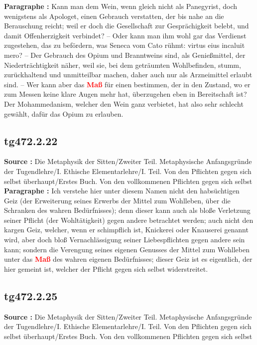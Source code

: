 \documentclass[a4paper,12pt,twoside]{book}
\newcommand{\match}[1]{\textcolor{red}{\textbf{#1}}}
\begin{document}
	\textbf{Paragraphe : }Kann man dem Wein, wenn gleich nicht als Panegyrist, doch wenigstens als Apologet, einen Gebrauch verstatten, der bis nahe an die Berauschung reicht; weil er doch die Gesellschaft zur Gesprächigkeit belebt, und damit Offenherzigkeit verbindet? – Oder kann man ihm wohl gar das Verdienst zugestehen, das zu befördern, was Seneca vom Cato rühmt: virtus eius incaluit mero? – Der Gebrauch des Opium und Branntweins sind, als Genießmittel, der Niederträchtigkeit näher, weil sie, bei dem geträumten Wohlbefinden, stumm, zurückhaltend und unmitteilbar machen, daher auch nur als Arzneimittel erlaubt sind. – Wer kann aber das \match{Maß} für einen bestimmen, der in den Zustand, wo er zum Messen keine klare Augen mehr hat, überzugehen eben in Bereitschaft ist? Der Mohammedanism, welcher den Wein ganz verbietet, hat also sehr schlecht gewählt, dafür das Opium zu erlauben. 
	
	\subsection*{tg472.2.22} 
	\textbf{Source : }Die Metaphysik der Sitten/Zweiter Teil. Metaphysische Anfangsgründe der Tugendlehre/I. Ethische Elementarlehre/I. Teil. Von den Pflichten gegen sich selbst überhaupt/Erstes Buch. Von den vollkommenen Pflichten gegen sich selbst\\  
	
	\textbf{Paragraphe : }Ich verstehe hier unter diesem Namen nicht den habsüchtigen Geiz (der Erweiterung seines Erwerbs der Mittel zum Wohlleben, über die Schranken des wahren Bedürfnisses); denn dieser kann auch als bloße Verletzung seiner Pflicht (der Wohltätigkeit) gegen andere betrachtet werden;  auch nicht den kargen Geiz, welcher, wenn er schimpflich ist, Knickerei oder Knauserei genannt wird, aber doch bloß Vernachlässigung seiner Liebespflichten gegen andere sein kann; sondern die Verengung seines eigenen Genusses der Mittel zum Wohlleben unter das \match{Maß} des wahren eigenen Bedürfnisses; dieser Geiz ist es eigentlich, der hier gemeint ist, welcher der Pflicht gegen sich selbst widerstreitet. 
	
	\subsection*{tg472.2.25} 
	\textbf{Source : }Die Metaphysik der Sitten/Zweiter Teil. Metaphysische Anfangsgründe der Tugendlehre/I. Ethische Elementarlehre/I. Teil. Von den Pflichten gegen sich selbst überhaupt/Erstes Buch. Von den vollkommenen Pflichten gegen sich selbst\\  
	
\end{document}
